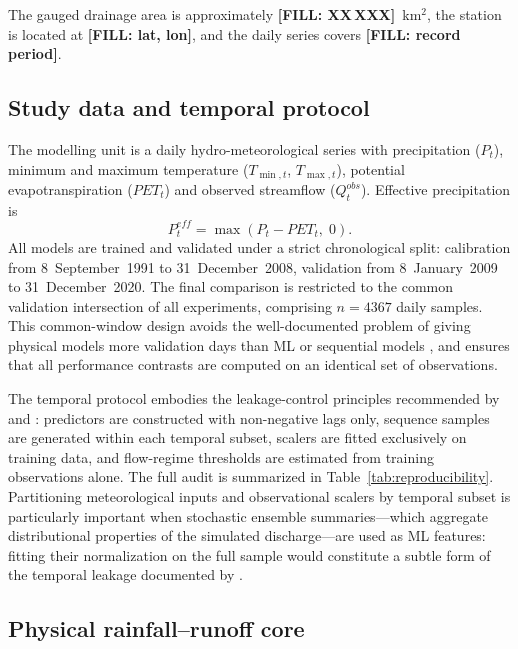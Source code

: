 \documentclass[a4paper,fleqn]{cas-sc}
\begin{document}
The gauged drainage area is approximately
\textbf{[FILL: XX\,XXX]}~km$^2$, the station is located at
\textbf{[FILL: lat, lon]}, and the daily series covers
\textbf{[FILL: record period]}.

\subsection{Study data and temporal protocol}\label{subsec:data-protocol}

The modelling unit is a daily hydro-meteorological series with
precipitation ($P_t$), minimum and maximum temperature
($T_{\min,t}$, $T_{\max,t}$), potential evapotranspiration ($PET_t$)
and observed streamflow ($Q^{obs}_t$). Effective precipitation is
\begin{equation}
P^{eff}_t = \max(P_t - PET_t,\;0).
\label{eq:peff}
\end{equation}
All models are trained and validated under a strict chronological
split: calibration from 8~September~1991 to 31~December~2008,
validation from 8~January~2009 to 31~December~2020. The final
comparison is restricted to the common validation intersection of all
experiments, comprising $n=4367$ daily samples. This common-window
design avoids the well-documented problem of giving physical models more
validation days than ML or sequential models \citep{lees2021}, and
ensures that all performance contrasts are computed on an identical
set of observations.

The temporal protocol embodies the leakage-control principles
recommended by \citet{arsenault2022} and \citet{chen2013}: predictors
are constructed with non-negative lags only, sequence samples are
generated within each temporal subset, scalers are fitted exclusively
on training data, and flow-regime thresholds are estimated from
training observations alone. The full audit is summarized in
Table~\ref{tab:reproducibility}. Partitioning meteorological inputs
and observational scalers by temporal subset is particularly important
when stochastic ensemble summaries---which aggregate distributional
properties of the simulated discharge---are used as ML features:
fitting their normalization on the full sample would constitute a
subtle form of the temporal leakage documented by
\citet{arsenault2022}.

\subsection{Physical rainfall--runoff core}\label{subsec:physical-core}
\end{document}
